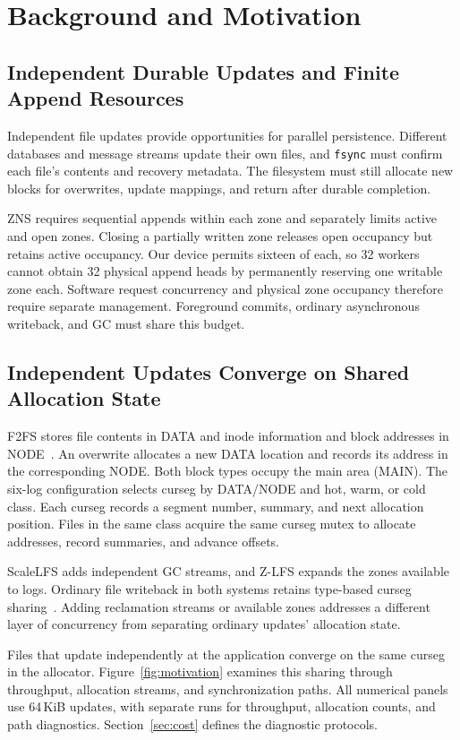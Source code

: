 \section{Background and Motivation}\label{sec:motivation}
\subsection{Independent Durable Updates and Finite Append Resources}
Independent file updates provide opportunities for parallel persistence.
Different databases and message streams update their own files, and \texttt{fsync} must confirm each file's contents and recovery metadata.
The filesystem must still allocate new blocks for overwrites, update mappings, and return after durable completion.

ZNS requires sequential appends within each zone and separately limits active and open zones.
Closing a partially written zone releases open occupancy but retains active occupancy.
Our device permits sixteen of each, so 32 workers cannot obtain 32 physical append heads by permanently reserving one writable zone each.
Software request concurrency and physical zone occupancy therefore require separate management.
Foreground commits, ordinary asynchronous writeback, and GC must share this budget.

\subsection{Independent Updates Converge on Shared Allocation State}
F2FS stores file contents in DATA and inode information and block addresses in NODE~\cite{r1}.
An overwrite allocates a new DATA location and records its address in the corresponding NODE.
Both block types occupy the main area (MAIN).
The six-log configuration selects curseg by DATA/NODE and hot, warm, or cold class.
Each curseg records a segment number, summary, and next allocation position.
Files in the same class acquire the same curseg mutex to allocate addresses, record summaries, and advance offsets.

ScaleLFS adds independent GC streams, and Z-LFS expands the zones available to logs.
Ordinary file writeback in both systems retains type-based curseg sharing~\cite{r5,r8,r13,r14}.
Adding reclamation streams or available zones addresses a different layer of concurrency from separating ordinary updates' allocation state.

Files that update independently at the application converge on the same curseg in the allocator.
Figure~\ref{fig:motivation} examines this sharing through throughput, allocation streams, and synchronization paths.
All numerical panels use 64\,KiB updates, with separate runs for throughput, allocation counts, and path diagnostics.
Section~\ref{sec:cost} defines the diagnostic protocols.




